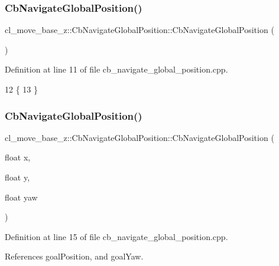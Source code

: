 \subsubsection{\texorpdfstring{Cb\+Navigate\+Global\+Position()}{CbNavigateGlobalPosition()}\hspace{0.1cm}{\footnotesize\ttfamily [1/2]}}
{\footnotesize\ttfamily cl\+\_\+move\+\_\+base\+\_\+z\+::\+Cb\+Navigate\+Global\+Position\+::\+Cb\+Navigate\+Global\+Position (\begin{DoxyParamCaption}{ }\end{DoxyParamCaption})}



Definition at line 11 of file cb\+\_\+navigate\+\_\+global\+\_\+position.\+cpp.


\begin{DoxyCode}
12     \{
13     \}
\end{DoxyCode}
\mbox{\label{classcl__move__base__z_1_1CbNavigateGlobalPosition_a79d42c0eeee48af5e73d917fa2d5b4f5}} 
\subsubsection{\texorpdfstring{Cb\+Navigate\+Global\+Position()}{CbNavigateGlobalPosition()}\hspace{0.1cm}{\footnotesize\ttfamily [2/2]}}
{\footnotesize\ttfamily cl\+\_\+move\+\_\+base\+\_\+z\+::\+Cb\+Navigate\+Global\+Position\+::\+Cb\+Navigate\+Global\+Position (\begin{DoxyParamCaption}\item[{float}]{x,  }\item[{float}]{y,  }\item[{float}]{yaw }\end{DoxyParamCaption})}



Definition at line 15 of file cb\+\_\+navigate\+\_\+global\+\_\+position.\+cpp.



References goal\+Position, and goal\+Yaw.


